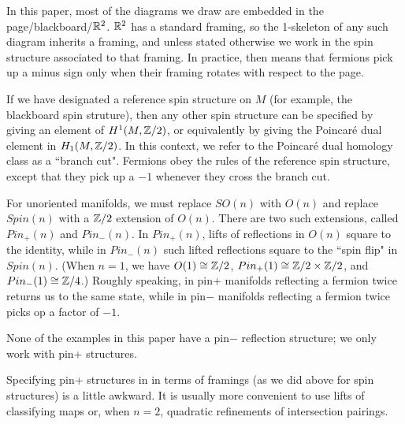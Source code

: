 In this paper, most of the diagrams we draw are embedded in the page/blackboard/$\mathbb{R}^2$.
$\mathbb{R}^2$ has a standard framing, so the 1-skeleton of any such diagram inherits a framing, and unless stated otherwise we work in the spin
structure associated to that framing.
In practice, then means that fermions pick up a minus sign only when their framing rotates with respect to the page.

If we have designated a reference spin structure on $M$ (for example, the blackboard spin struture), 
then any other spin structure can be specified by giving an
element of $H^1(M, \mathbb{Z}/2)$, or equivalently by giving the Poincar\'e dual element in $H_1(M, \mathbb{Z}/2)$.
In this context, we refer to the Poincar\'e dual homology class as a ``branch cut".
Fermions obey the rules of the reference spin structure, except that they pick up a $-1$ whenever they cross the branch cut.

\medskip

For unoriented manifolds, we must replace $SO(n)$ with $O(n)$ and replace $Spin(n)$ with a $\mathbb{Z}/2$ extension of $O(n)$.
There are two such extensions, called $Pin_+(n)$ and $Pin_-(n)$.
In $Pin_+(n)$, lifts of reflections in $O(n)$ square to the identity, while in $Pin_-(n)$ such lifted reflections square to the ``spin flip"
in $Spin(n)$.
(When $n=1$, we have $O(1)\cong\mathbb{Z}/2$, $Pin_+(1)\cong\mathbb{Z}/2\times\mathbb{Z}/2$, and $Pin_-(1)\cong\mathbb{Z}/4$.)
Roughly speaking, in pin+ manifolds reflecting a fermion twice returns us to the same state, while in pin$-$ manifolds reflecting a fermion twice
picks op a factor of $-1$.

None of the examples in this paper have a pin$-$ reflection structure; we only work with pin+ structures.

Specifying pin+ structures in in terms of framings (as we did above for spin structures) is a little awkward.
It is usually more convenient to use lifts of classifying maps or, when $n=2$, quadratic refinements of intersection pairings.


